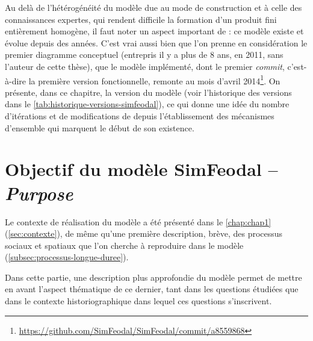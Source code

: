 Au delà de l'hétérogénéité du modèle due au mode de construction et à celle des connaissances expertes, qui rendent difficile la formation d'un produit fini entièrement homogène, il faut noter un aspect important de \simfeodal{} : ce modèle existe et évolue depuis des années.
C'est vrai aussi bien que l'on prenne en considération le premier diagramme conceptuel (entrepris il y a plus de 8 ans, en 2011, sans l'auteur de cette thèse), que le modèle implémenté, dont le premier \textit{commit}, c'est-à-dire la première version fonctionnelle, remonte au mois d'avril 2014\footnote{
\href{https://github.com/SimFeodal/SimFeodal/commit/a85598682cda2350b08ea789b966e613dacb1b05}{https://github.com/SimFeodal/SimFeodal/commit/a8559868}}.
On présente, dans ce chapitre, la version \fg{} du modèle (voir l'historique des versions dans le \cref{tab:historique-versions-simfeodal}), ce qui donne une idée du nombre d'itérations et de modifications de \simfeodal{} depuis l'établissement des mécanismes d'ensemble qui marquent le début de son existence.



\let\orisectionmark\sectionmark
\renewcommand\sectionmark[1]{}%
\section[Objectifs du modèle SimFeodal -- \textit{Purpose}]{Objectif du modèle SimFeodal -- \large{\textit{Purpose}}}
\orisectionmark{Objectifs}
\let\sectionmark\orisectionmark

Le contexte de réalisation du modèle \simfeodal{} a été présenté dans le \cref{chap:chap1} (\cref{sec:contexte}), de même qu'une première description, brève, des processus sociaux et spatiaux que l'on cherche à reproduire dans le modèle (\cref{subsec:processus-longue-duree}).

Dans cette partie, une description plus approfondie du modèle permet de mettre en avant l'aspect thématique de ce dernier, tant dans les questions étudiées que dans le contexte historiographique dans lequel ces questions s'inscrivent.


